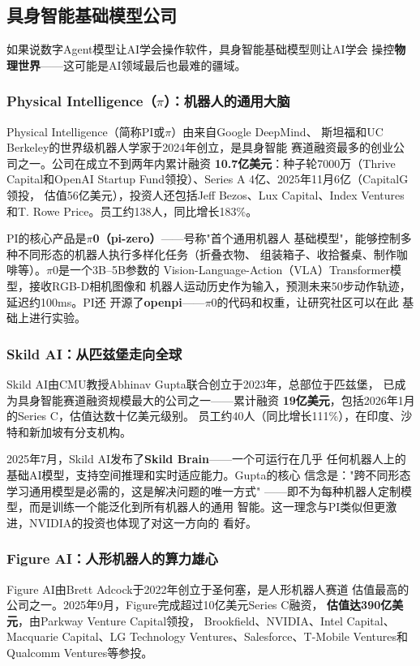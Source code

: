 \subsection{具身智能基础模型公司}
\label{subsec:embodied-models}

如果说数字Agent模型让AI学会操作软件，具身智能基础模型则让AI学会
操控\textbf{物理世界}——这可能是AI领域最后也最难的疆域。

\subsubsection{Physical Intelligence（$\pi$）：机器人的通用大脑}
Physical Intelligence（简称PI或$\pi$）由来自Google DeepMind、
斯坦福和UC Berkeley的世界级机器人学家于2024年创立，是具身智能
赛道融资最多的创业公司之一。公司在成立不到两年内累计融资
\textbf{10.7亿美元}：种子轮7000万（Thrive Capital和OpenAI
Startup Fund领投）、Series A 4亿、2025年11月6亿（CapitalG领投，
估值56亿美元），投资人还包括Jeff Bezos、Lux Capital、Index
Ventures和T. Rowe Price。员工约138人，同比增长183\%。

PI的核心产品是\textbf{$\pi$0（pi-zero）}——号称"首个通用机器人
基础模型"，能够控制多种不同形态的机器人执行多样化任务（折叠衣物、
组装箱子、收拾餐桌、制作咖啡等）。$\pi$0是一个3B--5B参数的
Vision-Language-Action（VLA）Transformer模型，接收RGB-D相机图像和
机器人运动历史作为输入，预测未来50步动作轨迹，延迟约100ms。PI还
开源了\textbf{openpi}——$\pi$0的代码和权重，让研究社区可以在此
基础上进行实验。

\subsubsection{Skild AI：从匹兹堡走向全球}
Skild AI由CMU教授Abhinav Gupta联合创立于2023年，总部位于匹兹堡，
已成为具身智能赛道融资规模最大的公司之一——累计融资
\textbf{19亿美元}，包括2026年1月的Series C，估值达数十亿美元级别。
员工约40人（同比增长111\%），在印度、沙特和新加坡有分支机构。

2025年7月，Skild AI发布了\textbf{Skild Brain}——一个可运行在几乎
任何机器人上的基础AI模型，支持空间推理和实时适应能力。Gupta的核心
信念是："跨不同形态学习通用模型是必需的，这是解决问题的唯一方式"
——即不为每种机器人定制模型，而是训练一个能泛化到所有机器人的通用
智能。这一理念与PI类似但更激进，NVIDIA的投资也体现了对这一方向的
看好。

\subsubsection{Figure AI：人形机器人的算力雄心}
Figure AI由Brett Adcock于2022年创立于圣何塞，是人形机器人赛道
估值最高的公司之一。2025年9月，Figure完成超过10亿美元Series C融资，
\textbf{估值达390亿美元}，由Parkway Venture Capital领投，
Brookfield、NVIDIA、Intel Capital、Macquarie Capital、LG Technology
Ventures、Salesforce、T-Mobile Ventures和Qualcomm Ventures等参投。

